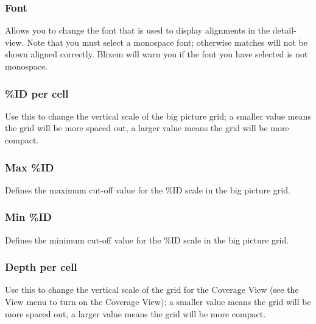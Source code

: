 \documentclass[letterpaper]{article}
\begin{document}
\bigskip

{\color[rgb]{0.30980393,0.5058824,0.7411765}\subsubsection[Font]{Font}}
\hypertarget{RefHeading2441056909880}{}
Allows you to change the font that is used to display alignments in the detail-view. Note that you must select a monospace font; otherwise matches will not be shown aligned correctly. Blixem will warn you if the font you have selected is not monospace.

\bigskip

{\color[rgb]{0.30980393,0.5058824,0.7411765}\subsubsection[\%ID per cell]{\%ID per cell}}
\hypertarget{RefHeading2561056909880}{}
Use this to change the vertical scale of the big picture grid; a smaller value means the grid will be more spaced out, a larger value means the grid will be more compact.

\bigskip

{\color[rgb]{0.30980393,0.5058824,0.7411765}\subsubsection[Max \%ID]{Max \%ID}}
\hypertarget{RefHeading2581056909880}{}
Defines the maximum cut-off value for the \%ID scale in the big picture grid.

\bigskip

{\color[rgb]{0.30980393,0.5058824,0.7411765}\subsubsection[Min \%ID]{Min \%ID}}
\hypertarget{RefHeading2601056909880}{}
Defines the minimum cut-off value for the \%ID scale in the big picture grid.

\bigskip

{\color[rgb]{0.30980393,0.5058824,0.7411765}\subsubsection[Depth per cell]{Depth per cell}}
\hypertarget{RefHeading334716266717}{}
Use this to change the vertical scale of the grid for the Coverage View (see the View menu to turn on the Coverage View); a smaller value means the grid will be more spaced out, a larger value means the grid will be more compact.
\end{document}
